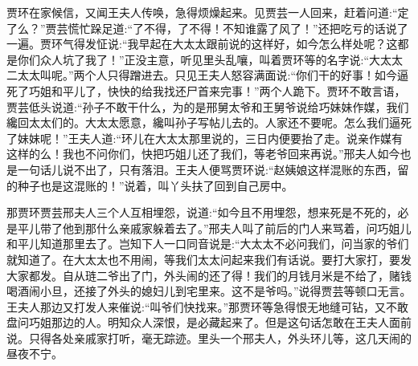 \begin{parag}
    贾环在家候信，又闻王夫人传唤，急得烦燥起来。见贾芸一人回来，赶着问道:“定了么？”贾芸慌忙跺足道:“了不得，了不得！不知谁露了风了！”还把吃亏的话说了一遍。贾环气得发怔说:“我早起在大太太跟前说的这样好，如今怎么样处呢？这都是你们众人坑了我了！”正没主意，听见里头乱嚷，叫着贾环等的名字说:“大太太二太太叫呢。”两个人只得蹭进去。只见王夫人怒容满面说:“你们干的好事！如今逼死了巧姐和平儿了，快快的给我找还尸首来完事！”两个人跪下。贾环不敢言语，贾芸低头说道:“孙子不敢干什么，为的是邢舅太爷和王舅爷说给巧妹妹作媒，我们纔回太太们的。大太太愿意，纔叫孙子写帖儿去的。人家还不要呢。怎么我们逼死了妹妹呢！”王夫人道:“环儿在大太太那里说的，三日内便要抬了走。说亲作媒有这样的么！我也不问你们，快把巧姐儿还了我们，等老爷回来再说。”邢夫人如今也是一句话儿说不出了，只有落泪。王夫人便骂贾环说:“赵姨娘这样混账的东西，留的种子也是这混账的！”说着，叫丫头扶了回到自己房中。
\end{parag}


\begin{parag}
    那贾环贾芸邢夫人三个人互相埋怨，说道:“如今且不用埋怨，想来死是不死的，必是平儿带了他到那什么亲戚家躲着去了。”邢夫人叫了前后的门人来骂着，问巧姐儿和平儿知道那里去了。岂知下人一口同音说是:“大太太不必问我们，问当家的爷们就知道了。在大太太也不用闹，等我们太太问起来我们有话说。要打大家打，要发大家都发。自从琏二爷出了门，外头闹的还了得！我们的月钱月米是不给了，赌钱喝酒闹小旦，还接了外头的媳妇儿到宅里来。这不是爷吗。”说得贾芸等顿口无言。王夫人那边又打发人来催说:“叫爷们快找来。”那贾环等急得恨无地缝可钻，又不敢盘问巧姐那边的人。明知众人深恨，是必藏起来了。但是这句话怎敢在王夫人面前说。只得各处亲戚家打听，毫无踪迹。里头一个邢夫人，外头环儿等，这几天闹的昼夜不宁。
\end{parag}


